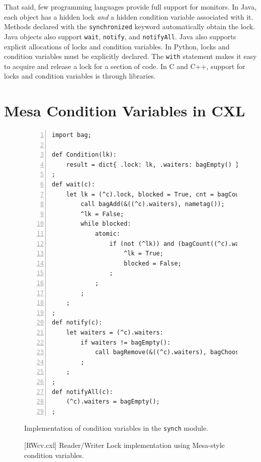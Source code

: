 \documentclass{report}
\newenvironment{code}{
\tcolorbox
}{
\endtcolorbox
}
\begin{document}
That said, few programming languages provide full support for monitors.
In Java, each object has a hidden lock \emph{and} a hidden condition variable
associated with it.
Methods declared with the \texttt{synchronized} keyword automatically
obtain the lock.  Java objects also support \texttt{wait}, \texttt{notify},
and \texttt{notifyAll}.  Java also supports explicit allocations of locks
and condition variables.
In Python, locks and condition variables must be explicitly declared.
The \texttt{with} statement makes it easy to acquire and release a lock
for a section of code.
In C and C++, support for locks and condition variables is through libraries.

\chapter{Mesa Condition Variables in CXL}

\begin{figure}
\begin{code}
\begin{Verbatim}[xleftmargin=5mm,numbers=left]
import bag;

def Condition(lk):
    result = dict{ .lock: lk, .waiters: bagEmpty() };
;
def wait(c):
    let lk = (^c).lock, blocked = True, cnt = bagCount((^c).waiters, nametag()):
        call bagAdd(&((^c).waiters), nametag());
        ^lk = False;
        while blocked:
            atomic:
                if (not (^lk)) and (bagCount((^c).waiters, nametag()) <= cnt):
                    ^lk = True;
                    blocked = False;
                ;
            ;
        ;
    ;
;
def notify(c):
    let waiters = (^c).waiters:
        if waiters != bagEmpty():
            call bagRemove(&((^c).waiters), bagChoose(waiters));
        ;
    ;
;
def notifyAll(c):
    (^c).waiters = bagEmpty();
;
\end{Verbatim}
\end{code}
\caption{Implementation of condition variables in the \texttt{synch} module.}
\label{fig:cv}
\end{figure}

\begin{figure}
\begin{code}
\end{code}
\caption{[RWcv.cxl] Reader/Writer Lock implementation using Mesa-style condition variables.}
\label{fig:RWcv}
\end{figure}
\end{document}
